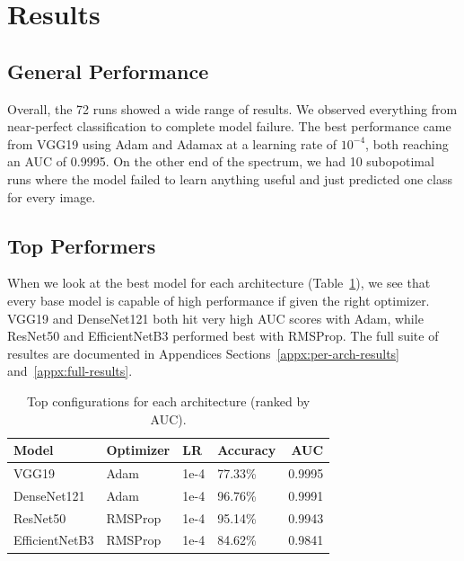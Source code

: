 \section{Results}
\label{sec:results}

\subsection{General Performance}

Overall, the 72 runs showed a wide range of results. We observed everything from near-perfect classification to complete model failure. The best performance came from VGG19 using Adam and Adamax at a learning rate of $10^{-4}$, both reaching an AUC of 0.9995. On the other end of the spectrum, we had 10 subopotimal runs where the model failed to learn anything useful and just predicted one class for every image.

\subsection{Top Performers}

When we look at the best model for each architecture (Table~\ref{tab:best-arch}), we see that every base model is capable of high performance if given the right optimizer. VGG19 and DenseNet121 both hit very high AUC scores with Adam, while ResNet50 and EfficientNetB3 performed best with RMSProp. The full suite of resultes are documented in Appendices Sections~\ref{appx:per-arch-results} and~\ref{appx:full-results}.

\begin{table}[H]
  \centering
  \caption[Per-Architecture AUC Ranking]{Top configurations for each architecture (ranked by AUC).}
  \label{tab:best-arch}
  \begin{tabular}{llllr}
    \toprule
    \rowcolor{tableheader}
    \textbf{Model} & \textbf{Optimizer} & \textbf{LR} & \textbf{Accuracy} & \textbf{AUC} \\
    \midrule
    VGG19          & Adam    & 1e-4 & 77.33\% & 0.9995 \\
    DenseNet121    & Adam    & 1e-4 & 96.76\% & 0.9991 \\
    ResNet50       & RMSProp & 1e-4 & 95.14\% & 0.9943 \\
    EfficientNetB3 & RMSProp & 1e-4 & 84.62\% & 0.9841 \\
    \bottomrule
  \end{tabular}
\end{table}

